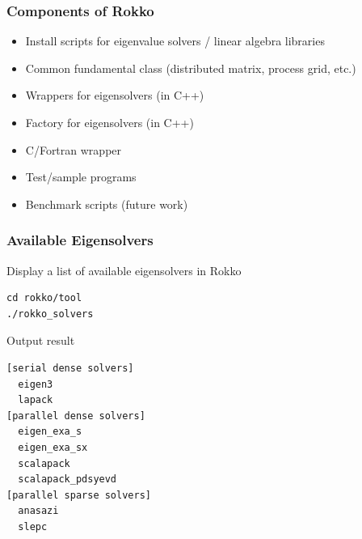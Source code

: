 \begin{frame}
  \frametitle{Components of Rokko}
  \begin{itemize}
  \item Install scripts for eigenvalue solvers / linear algebra libraries
  \item Common fundamental class (distributed matrix, process grid, etc.)
  \item Wrappers for eigensolvers (in C++)
  \item Factory for eigensolvers (in C++)
  \item C/Fortran wrapper
  \item Test/sample programs
  \item Benchmark scripts (future work)
  \end{itemize}
\end{frame}


\begin{frame}[c,fragile]
  \frametitle{Available Eigensolvers}
Display a list of available eigensolvers in Rokko\\
\begin{lstlisting}[style=shstyle]
cd rokko/tool
./rokko_solvers
\end{lstlisting}

Output result
\begin{lstlisting}[style=shstyle]
[serial dense solvers]
  eigen3
  lapack
[parallel dense solvers]
  eigen_exa_s
  eigen_exa_sx
  scalapack
  scalapack_pdsyevd
[parallel sparse solvers]
  anasazi
  slepc
\end{lstlisting}

\end{frame}

